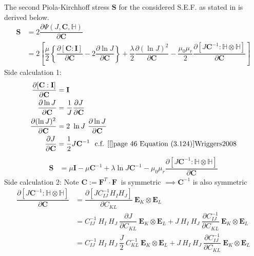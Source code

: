 The second Piola-Kirchhoff stress $\mathbf{S}$ for the considered S.E.F. as stated in  is derived below.
\begin{align*}
\mathbf{S} &= 2 \dfrac{\partial \Psi (J, \mathbf{C}, \mathbb{H})}{\partial \mathbf{C}} \\
&= 2 \left[ \dfrac{\mu}{2} \left\lbrace \dfrac{\partial [\mathbf{C} : \mathbf{I}]}{\partial \mathbf{C}} - 2 \dfrac{\partial \ln J}{\partial \mathbf{C}} \right\rbrace + \dfrac{\lambda}{2} \dfrac{\partial (\ln J)^2}{\partial \mathbf{C}} - \dfrac{\mu_0 \mu_r}{2} \dfrac{\partial [J \mathbf{C}^{-1} : \mathbb{H} \otimes \mathbb{H}]}{\partial \mathbf{C}} \right]
\end{align*}
Side calculation 1:
\begin{align*}
\dfrac{\partial [\mathbf{C} : \mathbf{I}]}{\partial \mathbf{C}} &= \mathbf{I} \\ 
\dfrac{\partial \ln J}{\partial \mathbf{C}} &= \dfrac{1}{J} \dfrac{\partial J}{\partial \mathbf{C}} \\
\dfrac{\partial (\ln J)^2}{\partial \mathbf{C}} &= 2 \ \ln J \ \dfrac{\partial \ln J}{\partial \mathbf{C}} \\
\dfrac{\partial J}{\partial \mathbf{C}} &= \dfrac{1}{2} J \mathbf{C}^{-1} \ \  \text{c.f. \cite[see][page 46 Equation (3.124)]{Wriggers2008}}
\end{align*}
\begin{align*}
\mathbf{S} &= \mu \mathbf{I} -  \mu \mathbf{C}^{-1} + \lambda \ln J \mathbf{C}^{-1} - \mu_0 \mu_r \dfrac{\partial [J \mathbf{C}^{-1} : \mathbb{H} \otimes \mathbb{H}]}{\partial \mathbf{C}}
\end{align*}
Side calculation 2: Note $\mathbf{C} := \mathbf{F}^T \cdot \mathbf{F} \ $ is symmetric $\implies \mathbf{C}^{-1}$ is also symmetric 
\begin{align*}
\dfrac{\partial [J \mathbf{C}^{-1} : \mathbb{H} \otimes \mathbb{H}]}{\partial \mathbf{C}} &= \dfrac{\partial [J C^{-1}_{IJ} H_I H_J]}{\partial C_{KL}} \ \mathbf{E}_K \otimes \mathbf{E}_L \\
&= C^{-1}_{IJ} \ H_I \ H_J \ \dfrac{\partial J}{\partial C_{KL}} \ \mathbf{E}_K \otimes \mathbf{E}_L + J \ H_I \ H_J \ \dfrac{\partial C^{-1}_{IJ}}{\partial C_{KL}} \ \mathbf{E}_K \otimes \mathbf{E}_L \\
&= C^{-1}_{IJ} \ H_I \ H_J \ \dfrac{J}{2} \ C^{-1}_{KL} \ \mathbf{E}_K \otimes \mathbf{E}_L + J \ H_I \ H_J \  \dfrac{\partial C^{-1}_{IJ}}{\partial C_{KL}} \ \mathbf{E}_K \otimes \mathbf{E}_L
\end{align*}
